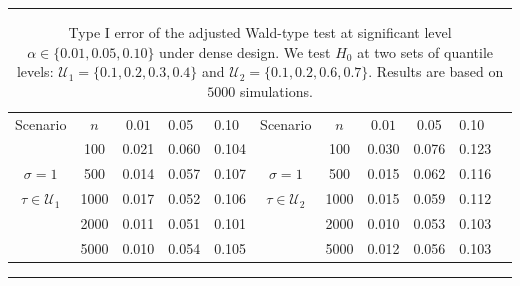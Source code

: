 \documentclass[times,sort&compress,3p]{elsarticle}
\theoremstyle{plain}%
\theoremstyle{definition}
\begin{document}
\begin{table}[t!] 
	\centering
	\caption{Type I error of the adjusted Wald-type test at significant level $\alpha \in \{0.01, 0.05, 0.10\}$ under dense design. We test $H_0$ at two sets of quantile levels:  $\mathcal{U}_1 =
		\{0.1, 0.2, 0.3, 0.4\}$ and $\mathcal{U}_2 = \{0.1, 0.2, 0.6, 0.7\}$. Results are based on $5000$ simulations.}
	\label{table:type1_dense}
	\hrule
	\begin{tabular}{cccllccccll}
		Scenario & $n$  & $0.01$ & 0.05 & 0.10 & Scenario & $n$  & $0.01$ & 0.05 & 0.10 \\ %
		\cmidrule(lr){1-5} \cmidrule(lr){6-10}
		& 100 & 0.021 & 0.060 & 0.104   & &   100 &     0.030 & 0.076 & 0.123 \\ 
		$\sigma = 1$ &  500 & 0.014 & 0.057 & 0.107   & $\sigma = 1$ &   500 &    0.015 & 0.062 & 0.116 \\ 
		$ \tau \in \mathcal{U}_1$ &  1000 & 0.017 & 0.052 & 0.106   & $ \tau \in \mathcal{U}_2$ &  1000 &     0.015 & 0.059 & 0.112 \\ 
		& 2000 & 0.011 & 0.051 & 0.101   & & 2000 &     0.010 & 0.053 & 0.103 \\
		& 5000 & 0.010 & 0.054 & 0.105   & & 5000 &     0.012 & 0.056 & 0.103 \\ 
	\end{tabular}
	\hrule 
\end{table} 
\end{document}
